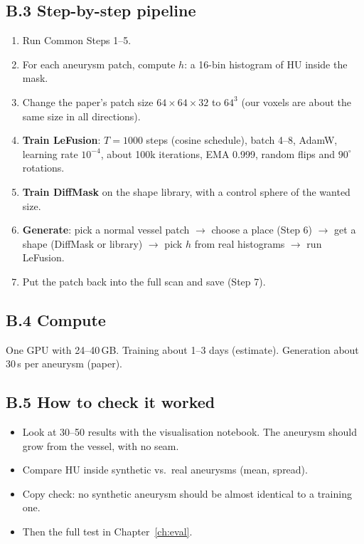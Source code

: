 \documentclass[11pt,a4paper,oneside]{report}
\begin{document}
\subsection*{B.3 Step-by-step pipeline}
\begin{enumerate}
  \item Run Common Steps 1--5.
  \item For each aneurysm patch, compute $h$: a 16-bin histogram of HU inside the mask.
  \item Change the paper's patch size $64\times64\times32$ to $64^3$ (our voxels are about the same size in all directions).
  \item \textbf{Train LeFusion}: $T=1000$ steps (cosine schedule), batch 4--8, AdamW, learning rate $10^{-4}$, about 100k iterations, EMA 0.999, random flips and $90^\circ$ rotations.
  \item \textbf{Train DiffMask} on the shape library, with a control sphere of the wanted size.
  \item \textbf{Generate}: pick a normal vessel patch $\rightarrow$ choose a place (Step 6) $\rightarrow$ get a shape (DiffMask or library) $\rightarrow$ pick $h$ from real histograms $\rightarrow$ run LeFusion.
  \item Put the patch back into the full scan and save (Step 7).
\end{enumerate}

\subsection*{B.4 Compute}
One GPU with 24--40\,GB. Training about 1--3 days (estimate). Generation about 30\,s per aneurysm (paper).

\subsection*{B.5 How to check it worked}
\begin{itemize}
  \item Look at 30--50 results with the visualisation notebook. The aneurysm should grow from the vessel, with no seam.
  \item Compare HU inside synthetic vs.\ real aneurysms (mean, spread).
  \item Copy check: no synthetic aneurysm should be almost identical to a training one.
  \item Then the full test in Chapter~\ref{ch:eval}.
\end{itemize}
\end{document}
